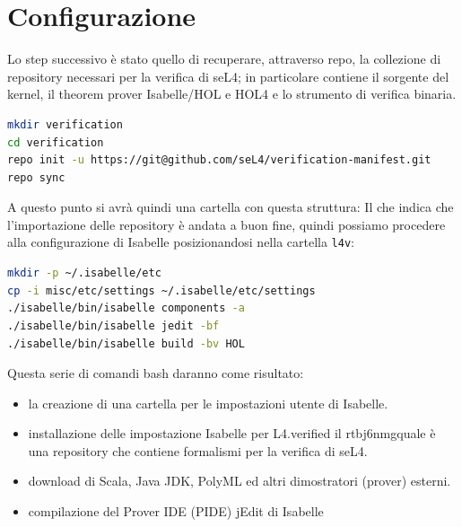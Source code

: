 \section{Configurazione}
Lo step successivo è stato quello di recuperare, attraverso repo, la collezione di repository necessari per la verifica di seL4; in particolare contiene il sorgente del kernel, il theorem prover Isabelle/HOL e HOL4 e lo strumento di verifica binaria.
\begin{lstlisting}[language=bash]
mkdir verification
cd verification
repo init -u https://git@github.com/seL4/verification-manifest.git
repo sync
\end{lstlisting}
A questo punto  si avrà quindi una cartella con questa struttura:
Il che indica che l'importazione delle repository è andata a buon fine, quindi possiamo procedere alla configurazione di Isabelle posizionandosi nella cartella \texttt{l4v}:
\begin{lstlisting}[language=bash]
mkdir -p ~/.isabelle/etc
cp -i misc/etc/settings ~/.isabelle/etc/settings
./isabelle/bin/isabelle components -a
./isabelle/bin/isabelle jedit -bf
./isabelle/bin/isabelle build -bv HOL
\end{lstlisting}
Questa serie di comandi bash daranno come risultato:
\begin{itemize}
	\item la creazione di una cartella per le impostazioni utente di Isabelle.
	\item installazione delle impostazione Isabelle per L4.verified \cite{l4v} il rtbj6nmgquale è una repository che contiene formalismi per la verifica di seL4.
	\item download di Scala, Java JDK, PolyML ed altri dimostratori (prover) esterni.
	\item compilazione del Prover IDE (PIDE) jEdit di Isabelle
\end{itemize} 

